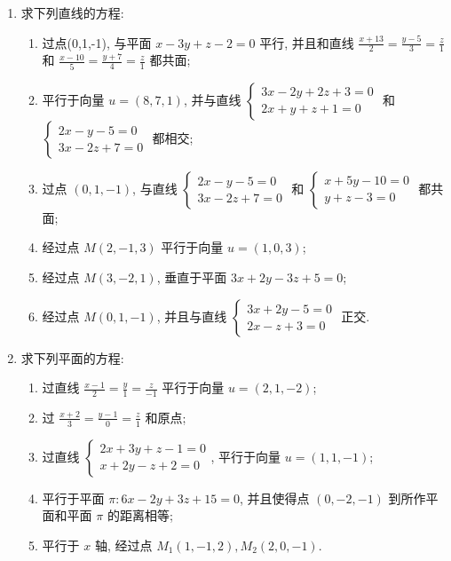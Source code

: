 \begin{enumerate}
    \item 求下列直线的方程:
    \begin{enumerate}
        \item 过点(0,1,-1), 与平面 $x-3y+z-2=0$ 平行, 并且和直线
        $\frac{x+13}{2}=\frac{y-5}{3}=\frac{z}{1}$ 和 $\frac{x-10}{5}=\frac{y+7}{4}=\frac{z}{1}$ 都共面;
        \item 平行于向量 $u=(8,7,1)$, 并与直线
        $\begin{cases}
            3x-2y+2z+3=0 \\
            2x+y+z+1=0
        \end{cases}$
        和
        $\begin{cases}
            2x-y-5=0 \\
            3x-2z+7=0
        \end{cases}$
        都相交;
        \item 过点 $(0,1,-1)$, 与直线
        $\begin{cases}
            2x-y-5=0 \\
            3x-2z+7=0
        \end{cases}$
        和
        $\begin{cases}
            x+5y-10=0 \\
            y+z-3=0
        \end{cases}$
        都共面;
        \item 经过点 $M(2,-1,3)$ 平行于向量 $u=(1,0,3)$;
        \item 经过点 $M(3,-2,1)$, 垂直于平面 $3x+2y-3z+5=0$;
        \item 经过点 $M(0,1,-1)$, 并且与直线
        $\begin{cases}
            3x+2y-5=0 \\
            2x-z+3=0
        \end{cases}$
        正交.
    \end{enumerate}

    \item 求下列平面的方程:
    \begin{enumerate}
        \item 过直线 $\frac{x-1}{2}=\frac{y}{1}=\frac{z}{-1}$ 平行于向量 $u=(2,1,-2)$;
        \item 过 $\frac{x+2}{3}=\frac{y-1}{0}=\frac{z}{1}$ 和原点;
        \item 过直线
        $\begin{cases}
            2x+3y+z-1=0 \\
            x+2y-z+2=0
        \end{cases}$,
        平行于向量 $u=(1,1,-1)$;
        \item 平行于平面 $\pi:6x-2y+3z+15=0$, 并且使得点 $(0,-2,-1)$ 到所作平面和平面 $\pi$ 的距离相等;
        \item 平行于 $ x $ 轴, 经过点 $M_{1}(1,-1,2), M_{2}(2,0,-1).$
    \end{enumerate}


\end{enumerate}
